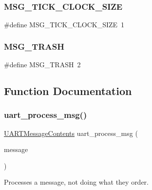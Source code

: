 \subsubsection{\texorpdfstring{M\+S\+G\+\_\+\+T\+I\+C\+K\+\_\+\+C\+L\+O\+C\+K\+\_\+\+S\+I\+ZE}{MSG\_TICK\_CLOCK\_SIZE}}
{\footnotesize\ttfamily \#define M\+S\+G\+\_\+\+T\+I\+C\+K\+\_\+\+C\+L\+O\+C\+K\+\_\+\+S\+I\+ZE~1}

\mbox{\label{group__uart__wordgame_gab273d0cd876a9c6ed9dd437bfc4093f9}} 
\subsubsection{\texorpdfstring{M\+S\+G\+\_\+\+T\+R\+A\+SH}{MSG\_TRASH}}
{\footnotesize\ttfamily \#define M\+S\+G\+\_\+\+T\+R\+A\+SH~2}



\subsection{Function Documentation}
\mbox{\label{group__uart__wordgame_gaa1fdee09f3f9af28335a782b49fafffe}} 
\subsubsection{\texorpdfstring{uart\+\_\+process\+\_\+msg()}{uart\_process\_msg()}}
{\footnotesize\ttfamily \mbox{\hyperlink{struct_u_a_r_t_message_contents}{U\+A\+R\+T\+Message\+Contents}} uart\+\_\+process\+\_\+msg (\begin{DoxyParamCaption}\item[{\mbox{\hyperlink{struct_u_a_r_t_message}{U\+A\+R\+T\+Message}} $\ast$}]{message }\end{DoxyParamCaption})}



Processes a message, not doing what they order. 


